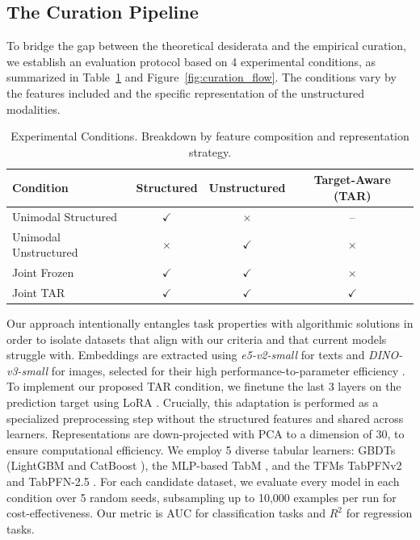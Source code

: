\documentclass{llmxive}
\begin{document}
\subsection{The Curation Pipeline}
\label{sec:benchmark_design}

To bridge the gap between the theoretical desiderata and the empirical curation, we establish an evaluation protocol based on 4 experimental conditions, as summarized in Table~\ref{tab:conditions} and Figure~\ref{fig:curation_flow}. The conditions vary by the features included and the specific representation of the unstructured modalities.


\begin{table}[ht]
\centering
\begin{tabular}{lccc}
\hline
\textbf{Condition} & \textbf{Structured} & \textbf{Unstructured} & \textbf{Target-Aware (TAR)} \\ \hline
Unimodal Structured   & $\checkmark$ & $\times$     & -- \\
Unimodal Unstructured & $\times$     & $\checkmark$ & $\times$ \\
Joint Frozen          & $\checkmark$ & $\checkmark$ & $\times$ \\
Joint TAR             & $\checkmark$ & $\checkmark$ & $\checkmark$ \\ \hline
\end{tabular}
\caption{Experimental Conditions. Breakdown by feature composition and representation strategy.}
\label{tab:conditions}
\end{table}

Our approach intentionally entangles task properties with algorithmic solutions in order to isolate datasets that align with our criteria and that current models struggle with.  Embeddings are extracted using \textit{e5-v2-small} \cite{wang_text_2024} for texts and \textit{DINO-v3-small} \cite{simeoni_dinov3_2025} for images, selected for their high performance-to-parameter efficiency \cite{muennighoff_mteb_2023}. To implement our proposed TAR condition, we finetune the last 3 layers on the prediction target using LoRA \cite{hu_lora_2021}. Crucially, this adaptation is performed as a specialized preprocessing step without the structured features and shared across learners. Representations are down-projected with PCA \cite{mackiewicz_principal_1993} to a dimension of 30, to ensure computational efficiency. We employ 5 diverse tabular learners: GBDTs (LightGBM \cite{ke_lightgbm_2017} and CatBoost \cite{prokhorenkova_catboost_2018}), the MLP-based TabM \cite{gorishniy_tabm_2025}, and the TFMs TabPFNv2 \cite{hollmann_accurate_2025} and TabPFN-2.5 \cite{grinsztajn_tabpfn-25_2026}. For each candidate dataset, we evaluate every model in each condition over 5 random seeds, subsampling up to 10,000 examples per run for cost-effectiveness. Our metric is AUC for classification tasks and $R^2$ for regression tasks. 
\end{document}
